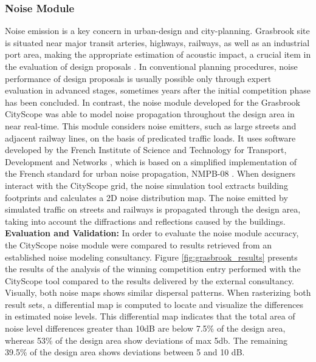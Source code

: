 {{        \subsubsection{Noise Module}
        {
            Noise emission is a key concern in urban-design and city-planning. Grasbrook site is situated near major transit arteries, highways, railways, as well as an industrial port area, making the appropriate estimation of acoustic impact, a crucial item in the evaluation of design proposals \cite{e19}. In conventional planning procedures, noise performance of design proposals is usually possible only through expert evaluation in advanced stages, sometimes years after the initial competition phase has been concluded. In contrast, the noise module developed for the Grasbrook CityScope was able to model noise propagation throughout the design area in near real-time.
            \newline
            This module considers noise emitters, such as large streets and adjacent railway lines, on the basis of predicated traffic loads. It uses software developed by the French Institute of Science and Technology for Transport, Development and Networks \cite{bgppf19}, which is based on a simplified implementation of the French standard for urban noise propagation, NMPB-08 \cite{n11}. When designers interact with the CityScope grid, the noise simulation tool extracts building footprints and calculates a 2D noise distribution map. The noise emitted by simulated traffic on streets and railways is propagated through the design area, taking into account the diffractions and reflections caused by the buildings.
            \newline
            \textbf{Evaluation and Validation:} In order to evaluate the noise module accuracy, the CityScope noise module were compared to results retrieved from an established noise modeling consultancy. Figure \eqref{fig:grasbrook_results} presents the results of the analysis of the winning competition entry performed with the CityScope tool compared to the results delivered by the external consultancy. Visually, both noise maps shows similar dispersal patterns. When rasterizing both result sets, a differential map is computed to locate and visualize the differences in estimated noise levels. This differential map indicates that the total area of noise level differences greater than 10dB are below 7.5\% of the design area, whereas 53\% of the design area show deviations of max 5db. The remaining 39.5\% of the design area shows deviations between 5 and 10 dB.
}}}

